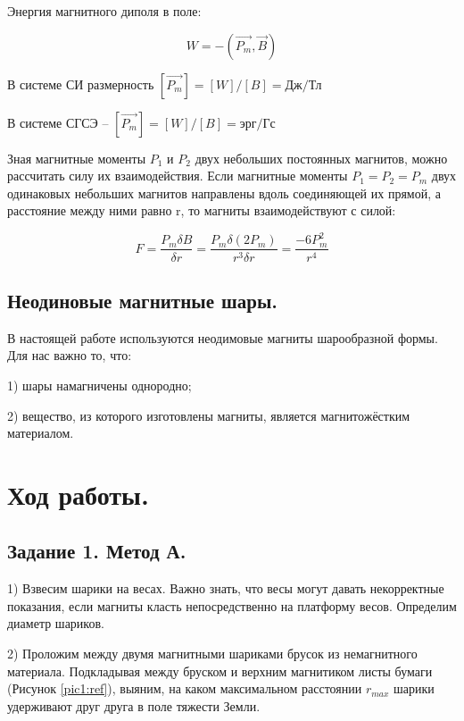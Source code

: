 \documentclass[a4paper,12pt]{article} %
\begin{document}
Энергия магнитного диполя в поле:

\begin{equation}\label{eq4}
W = -(\vec{P_m},\vec{B})
\end{equation}

В системе СИ размерность $[\vec{P_m}] = [W] / [B] = \text{Дж} / \text{Тл}$

В системе СГСЭ -- $[\vec{P_m}] = [W] / [B] = \text{эрг} / \text{Гс}$

Зная магнитные моменты $P_1$ и $P_2$ двух небольших постоянных магнитов, можно рассчитать силу их взаимодействия. Если магнитные моменты $P_1 = P_2 = P_m$ двух одинаковых небольших магнитов направлены вдоль соединяющей их прямой, а расстояние между ними равно r, то магниты взаимодействуют с силой:

\begin{equation}\label{eq5}
F = \frac{P_m \delta B}{\delta r} = \frac{P_m \delta (2P_m)}{r^3 \delta r} = \frac{-6 P_m^2}{r^4}
\end{equation}

\subsection{Неодиновые магнитные шары.}

В настоящей работе используются неодимовые магниты шарообразной формы.
Для нас важно то, что:

1) шары намагничены однородно;

2) вещество, из которого изготовлены магниты, является магнитожёстким материалом.

\section{Ход работы.}

\subsection{Задание 1. Метод А.}

1) Взвесим шарики на весах. Важно знать, что весы могут давать некорректные показания, если магниты класть непосредственно на платформу весов. Определим диаметр шариков.

2) Проложим между двумя магнитными шариками брусок из немагнитного материала. Подкладывая между бруском и верхним магнитиком листы бумаги (Рисунок \eqref{pic1:ref}), выяним, на каком максимальном расстоянии $r_{max}$ шарики удерживают друг друга в поле тяжести Земли.
\end{document}

